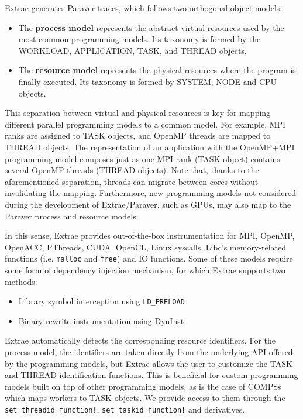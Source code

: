 \documentclass{juliacon}
\begin{document}
Extrae generates Paraver traces, which follows two orthogonal object models:

\begin{itemize}
    \item The \textbf{process model} represents the abstract virtual resources used by the most common programming models. Its taxonomy is formed by the WORKLOAD, APPLICATION, TASK, and THREAD objects.
    \item The \textbf{resource model} represents the physical resources where the program is finally executed. Its taxonomy is formed by SYSTEM, NODE and CPU objects.
\end{itemize}

This separation between virtual and physical resources is key for mapping different parallel programming models to a common model.
For example, MPI ranks are assigned to TASK objects, and OpenMP threads are mapped to THREAD objects.
The representation of an application with the OpenMP+MPI programming model composes just as one MPI rank (TASK object) contains several OpenMP threads (THREAD objects).
Note that, thanks to the aforementioned separation, threads can migrate between cores without invalidating the mapping.
Furthermore, new programming models not considered during the development of Extrae/Paraver, such as GPUs, may also map to the Paraver process and resource models.

In this sense, Extrae provides out-of-the-box instrumentation for MPI, OpenMP, OpenACC, PThreads, CUDA, OpenCL, Linux syscalls, Libc's memory-related functions (i.e. \texttt{malloc} and \texttt{free}) and IO functions.
Some of these models require some form of dependency injection mechanism, for which Extrae supports two methods:
\begin{itemize}
    \item Library symbol interception using \texttt{LD\_PRELOAD} 
    \item Binary rewrite instrumentation using DynInst
\end{itemize}

Extrae automatically detects the corresponding resource identifiers. For the process model, the identifiers are taken directly from the underlying API offered by the programming models, but Extrae allows the user to customize the TASK and THREAD identification functions.
This is beneficial for custom programming models built on top of other programming models, as is the case of COMPSs~\cite{badia2015comp} which maps workers to TASK objects.
We provide access to them through the \texttt{set\_threadid\_function!}, \texttt{set\_taskid\_function!} and derivatives.
\end{document}
